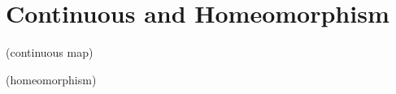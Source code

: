 \chapter{Continuous and Homeomorphism}

\begin{definition}
(continuous map)
\end{definition}

\begin{definition}
(homeomorphism)
\end{definition}




